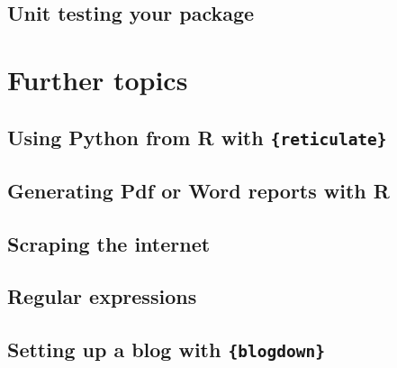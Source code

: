 \documentclass[]{gitbook}
\begin{document}
\hypertarget{unit-testing-your-package}{%
\subsection{Unit testing your package}\label{unit-testing-your-package}}

\hypertarget{further-topics}{%
\section{Further topics}\label{further-topics}}

\hypertarget{using-python-from-r-with-reticulate}{%
\subsection{\texorpdfstring{Using Python from R with \texttt{\{reticulate\}}}{Using Python from R with \{reticulate\}}}\label{using-python-from-r-with-reticulate}}

\hypertarget{generating-pdf-or-word-reports-with-r}{%
\subsection{Generating Pdf or Word reports with R}\label{generating-pdf-or-word-reports-with-r}}

\hypertarget{scraping-the-internet}{%
\subsection{Scraping the internet}\label{scraping-the-internet}}

\hypertarget{regular-expressions}{%
\subsection{Regular expressions}\label{regular-expressions}}

\hypertarget{setting-up-a-blog-with-blogdown}{%
\subsection{\texorpdfstring{Setting up a blog with \texttt{\{blogdown\}}}{Setting up a blog with \{blogdown\}}}\label{setting-up-a-blog-with-blogdown}}


\end{document}
